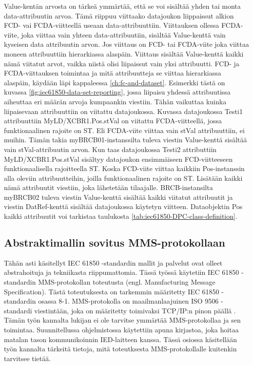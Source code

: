 Value-kentän arvosta on tärkeä ymmärtää, että se voi sisältää yhden tai monta data-attribuutin arvoa. Tämä riippuu viittaako datajoukon liippaissut alkion FCD- vai FCDA-viitteellä useaan data-attribuuttiin. Viittauksen ollessa FCDA-viite, joka viittaa vain yhteen data-attribuutiin, sisältää Value-kenttä vain kyseisen data attribuutin arvon. Jos viittaus on FCD- tai FCDA-viite joka viittaa moneen attribuuttiin hierarkiassa alaspäin. Viittaus sisältää Value-kenttä kaikki nämä viitatut arvot, vaikka niistä olisi liipaissut vain yksi attribuutti. FCD- ja FCDA-viittauksen toimintaa ja mitä attribuutteja se viittaa hierarkiassa alaspäin, käydään läpi kappaleessa \ref{ch:fc-and-dataset}. Esimerkki tästä on kuvassa \ref{fig:iec61850-data-set-reporting}, jossa liipaisu yhdessä attribuutissa aiheuttaa eri määrän arvoja kumpaankin viestiin. Tähän vaikuttaa kuinka liipaisevaan attribuuttiin on viitattu datajoukossa. Kuvassa datajoukossa Testi1 attribuuttiin MyLD/XCBR1.Pos.stVal on viitattu FCDA-viitteellä, jossa funktionaalinen rajoite on ST. Eli FCDA-viite viittaa vain stVal attribuuttiin, ei muihin. Tämän takia myBRCB01-instanssilta tuleva viestin Value-kenttä sisältää vain stVal-attribuutin arvon. Kun taas datajoukossa Testi2 attributtiin MyLD/XCBR1.Pos.stVal sisältyy datajoukon ensimmäiseen FCD-viitteeseen funktionaalisella rajoitteella ST. Koska FCD-viite viittaa kaikkiin Pos-instanssin alla oleviin attribuutteihin, joilla funktionaalinen rajoite on ST. Lisätään kaikki nämä attribuutit viestiin, joka lähetetään tilaajalle. BRCB-instansilta myBRCB02 tuleva viestin Value-kenttä sisältää kaikki viitatut attribuutit ja viestin DatRef-kenttä sisältää datajoukossa käytetyn viitteen. Dataobjektin Pos kaikki attribuutit voi tarkistaa taulukosta \ref{tab:iec61850-DPC-class-definition}. \cite[s.~40--44]{IEC61850-7-1} \cite[s.~108]{IEC61850-7-2}


\subsection{Abstraktimallin sovitus MMS-protokollaan}
\label{ch:iec61850-mms-mallinnus}
Tähän asti käsitellyt IEC 61850 -standardin mallit ja palvelut ovat olleet abstrahoituja ja tekniikasta riippumattomia. Tässä työssä käytetiin IEC 61850 -standardin MMS-protokollan toteutusta (engl. Manufacturing Message Specification). Tästä toteutuksesta on tarkemmin määritetty IEC 61850 -standardin osassa 8-1. MMS-protokolla on maailmanlaajuinen ISO 9506 -standardi viestintään, joka on määritetty toimivaksi TCP/IP:n pinon päällä \cite{MMS-protocol-stack-and-API}. Tämän työn kannalta lukijan ei ole tarvitse ymmärtää MMS-protokollaa ja sen toimintaa. Suunnitellussa ohjelmistossa käytettiin apuna kirjastoa, joka hoitaa matalan tason kommunikoinnin IED-laitteen kanssa. Tässä osiossa käsitellään työn kannalta tärkeitä tietoja, mitä toteutksesta MMS-protokollalle kuitenkin tarvitsee tietää. \cite{Introduction-to-the-MMS}

